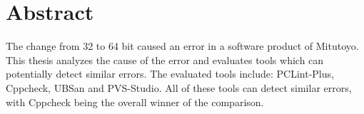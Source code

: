 \chapter*{Abstract}
\label{ch:abstract}

The change from 32 to 64 bit caused an error in a software product of Mitutoyo. \newline
This thesis analyzes the cause of the error and evaluates tools which can potentially detect similar errors. \newline
The evaluated tools include: PCLint-Plus, Cppcheck, UBSan and PVS-Studio. All of these tools can detect similar errors, with Cppcheck being the overall winner of the comparison.
